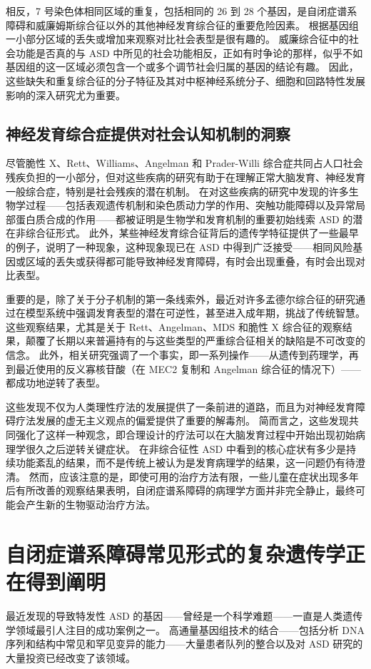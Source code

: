 相反，7 号染色体相同区域的重复，包括相同的 26 到 28 个基因，是自闭症谱系障碍和威廉姆斯综合征以外的其他神经发育综合征的重要危险因素。 根据基因组一小部分区域的丢失或增加来观察对比社会表型是很有趣的。 威廉综合征中的社会功能是否真的与 ASD 中所见的社会功能相反，正如有时争论的那样，似乎不如基因组的这一区域必须包含一个或多个调节社会归属的基因的结论有趣。 因此，这些缺失和重复综合征的分子特征及其对中枢神经系统分子、细胞和回路特性发展影响的深入研究尤为重要。

\subsection{神经发育综合症提供对社会认知机制的洞察}

尽管脆性 X、Rett、Williams、Angelman 和 Prader-Willi 综合症共同占人口社会残疾负担的一小部分，但对这些疾病的研究有助于在理解正常大脑发育、神经发育 一般综合症，特别是社会残疾的潜在机制。 在对这些疾病的研究中发现的许多生物学过程——包括表观遗传机制和染色质动力学的作用、突触功能障碍以及异常局部蛋白质合成的作用——都被证明是生物学和发育机制的重要初始线索 ASD 的潜在非综合征形式。 此外，某些神经发育综合征背后的遗传学特征提供了一些最早的例子，说明了一种现象，这种现象现已在 ASD 中得到广泛接受——相同风险基因或区域的丢失或获得都可能导致神经发育障碍，有时会出现重叠，有时会出现对比表型。

重要的是，除了关于分子机制的第一条线索外，最近对许多孟德尔综合征的研究通过在模型系统中强调发育表型的潜在可逆性，甚至进入成年期，挑战了传统智慧。 这些观察结果，尤其是关于 Rett、Angelman、MDS 和脆性 X 综合征的观察结果，颠覆了长期以来普遍持有的与这些类型的严重综合征相关的缺陷是不可改变的信念。 此外，相关研究强调了一个事实，即一系列操作——从遗传到药理学，再到最近使用的反义寡核苷酸（在 MEC2 复制和 Angelman 综合征的情况下）——都成功地逆转了表型。

这些发现不仅为人类理性疗法的发展提供了一条前进的道路，而且为对神经发育障碍疗法发展的虚无主义观点的偏爱提供了重要的解毒剂。 简而言之，这些发现共同强化了这样一种观念，即合理设计的疗法可以在大脑发育过程中开始出现初始病理学很久之后逆转关键症状。 在非综合征性 ASD 中看到的核心症状有多少是持续功能紊乱的结果，而不是传统上被认为是发育病理学的结果，这一问题仍有待澄清。 然而，应该注意的是，即使可用的治疗方法有限，一些儿童在症状出现多年后有所改善的观察结果表明，自闭症谱系障碍的病理学方面并非完全静止，最终可能会产生新的生物驱动治疗方法。

\section{自闭症谱系障碍常见形式的复杂遗传学正在得到阐明}
最近发现的导致特发性 ASD 的基因——曾经是一个科学难题——一直是人类遗传学领域最引人注目的成功案例之一。 高通量基因组技术的结合——包括分析 DNA 序列和结构中常见和罕见变异的能力——大量患者队列的整合以及对 ASD 研究的大量投资已经改变了该领域。

